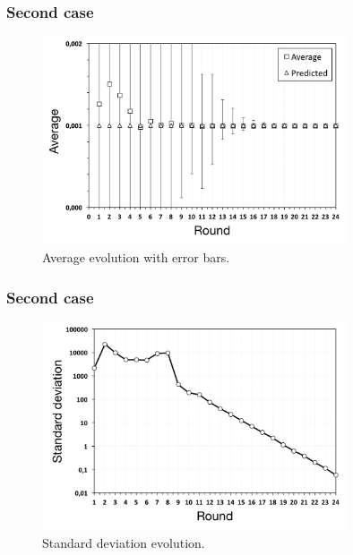 \documentclass{beamer}
\begin{document}
\begin{frame}
\frametitle{Second case}

\begin{figure}[p]
\centering
\includegraphics[keepaspectratio=true, width=0.8\textwidth]{images/counting_average}
\caption{Average evolution with error bars.}
\label{fig:counting_average}
\end{figure}

\end{frame}


\begin{frame}
\frametitle{Second case}
    
\begin{figure}[p]
\centering
\includegraphics[keepaspectratio=true, width=0.8\textwidth]{images/counting_standard_deviation}
\caption{Standard deviation evolution.}
\label{fig:counting_standard_deviation}
\end{figure}

\end{frame}
\end{document}
